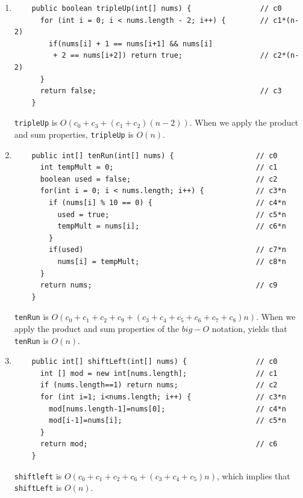 \documentclass[a4paper,12pt]{article}
\begin{document}
\begin{enumerate}
    \item \begin{Verbatim}
    public boolean tripleUp(int[] nums) {                // c0
      for (int i = 0; i < nums.length - 2; i++) {        // c1*(n-2)
        if(nums[i] + 1 == nums[i+1] && nums[i]
         + 2 == nums[i+2]) return true;                  // c2*(n-2)
      }
      return false;                                      // c3
    }
    \end{Verbatim}
    \texttt{tripleUp} is $O(c_0+c_3+(c_1+c_2)(n-2))$. When we apply the product
    and sum properties, \texttt{tripleUp} is $O(n)$.

    \item \begin{Verbatim}
    public int[] tenRun(int[] nums) {                   // c0
      int tempMult = 0;                                 // c1
      boolean used = false;                             // c2
      for(int i = 0; i < nums.length; i++) {            // c3*n
        if (nums[i] % 10 == 0) {                        // c4*n
          used = true;                                  // c5*n
          tempMult = nums[i];                           // c6*n
        }
        if(used)                                        // c7*n
          nums[i] = tempMult;                           // c8*n
      }
      return nums;                                      // c9
    }
    \end{Verbatim}
    \texttt{tenRun} is $O(c_0+c_1+c_2+c_9+(c_3+c_4+c_5+c_6+c_7+c_8)n)$. When we apply
    the product and sum properties of the $big-O$ notation, yields that
    \texttt{tenRun} is $O(n)$.

    \item \begin{Verbatim}
    public int[] shiftLeft(int[] nums) {                // c0
      int [] mod = new int[nums.length];                // c1
      if (nums.length==1) return nums;                  // c2
      for (int i=1; i<nums.length; i++) {               // c3*n
        mod[nums.length-1]=nums[0];                     // c4*n
        mod[i-1]=nums[i];                               // c5*n
      }
      return mod;                                       // c6
    }
    \end{Verbatim}
    \texttt{shiftleft} is $O(c_0+c_1+c_2+c_6+(c_3+c_4+c_5)n)$, which implies
    that \texttt{shiftLeft} is $O(n)$.
    \end{enumerate}
\end{document}
